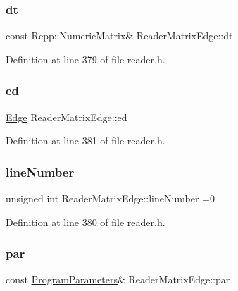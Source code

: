 \subsubsection{\texorpdfstring{dt}{dt}}
{\footnotesize\ttfamily const Rcpp\+::\+Numeric\+Matrix\& Reader\+Matrix\+Edge\+::dt\hspace{0.3cm}{\ttfamily [private]}}



Definition at line 379 of file reader.\+h.

\mbox{\label{classReaderMatrixEdge_a64e36f8be27ab6fd91be7b7213f748c5}} 
\subsubsection{\texorpdfstring{ed}{ed}}
{\footnotesize\ttfamily \hyperlink{classEdge}{Edge} Reader\+Matrix\+Edge\+::ed\hspace{0.3cm}{\ttfamily [private]}}



Definition at line 381 of file reader.\+h.

\mbox{\label{classReaderMatrixEdge_a07bbdbe9f633b2ca36e630a0eeba4010}} 
\subsubsection{\texorpdfstring{line\+Number}{lineNumber}}
{\footnotesize\ttfamily unsigned int Reader\+Matrix\+Edge\+::line\+Number =0\hspace{0.3cm}{\ttfamily [private]}}



Definition at line 380 of file reader.\+h.

\mbox{\label{classReaderMatrixEdge_a6bca38a1fa952962db149712f9468aec}} 
\subsubsection{\texorpdfstring{par}{par}}
{\footnotesize\ttfamily const \hyperlink{structProgramParameters}{Program\+Parameters}\& Reader\+Matrix\+Edge\+::par\hspace{0.3cm}{\ttfamily [private]}}



